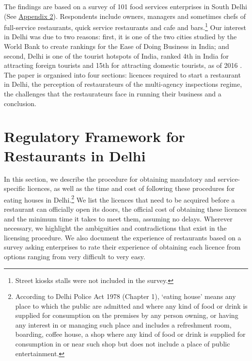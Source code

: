 \documentclass[a4paper, 12pt, twoside]{article}
\begin{document}
                    The findings are based on a survey of 101 food services enterprises in South Delhi (See \hyperref[Appendix 2]{Appendix 2}). Respondents include owners, managers and sometimes chefs of full-service restaurants, quick service restaurants and cafe 
and bars.\footnote{Street kiosks stalls were not included in the survey.} Our interest in Delhi was due to two reasons: first, it is one of the two cities studied by the World Bank to create rankings for the Ease of Doing Business in India; and second, Delhi is one of the tourist hotspots of India, ranked 4th in India for attracting foreign tourists and 15th for attracting domestic tourists, as of 2016 \parencite{goitourismstats}. \\
                    
                    The paper is organised into four sections: licences required to start a restaurant in Delhi, the perception of restaurateurs of the multi-agency inspections regime, the challenges that the restaurateurs face in running their business and a conclusion. 
            
                                        
                    \section{Regulatory Framework for Restaurants in Delhi}
                    \label{sec:1}
                    In this section, we describe the procedure for obtaining mandatory and service-specific licences, as well as the time and cost of following these procedures for eating houses in Delhi.\footnote{According to Delhi Police Act 1978 (Chapter 1), ‘eating house’ means any place to which the public are admitted and where any kind of food or drink is supplied for consumption on the premises by any person owning, or having any interest in or managing such place and includes a refreshment room, boarding, coffee house, a shop where any kind of food or drink is supplied for consumption in or near such shop but does not include a place of public entertainment.} We list the licences that need to be acquired before a restaurant can officially open its doors, the official cost of obtaining these licences and the minimum time it takes to meet them, assuming no delays. Wherever necessary, we highlight the ambiguities and contradictions that exist in the licensing procedure. We also document the experience of restaurants based on a survey asking enterprises to rate their experience of obtaining each licence from options ranging from very difficult to very easy.
                                   
\end{document}
